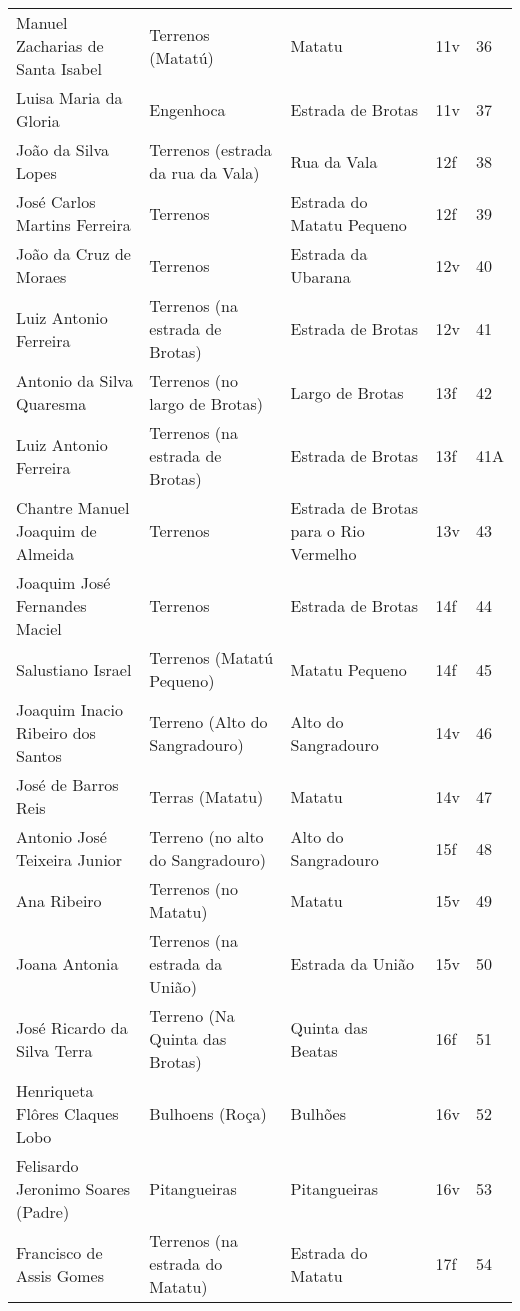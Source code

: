 \begin{table}
{\begin{minipage}{\textwidth}
\begin{tiny}
\begin{tabular}{p{4cm}p{4cm}p{4cm}ll}
Manuel Zacharias de Santa Isabel						&Terrenos (Matatú)			&Matatu					&11v			&36			\\
Luisa Maria da Gloria								&Engenhoca				&Estrada de Brotas			&11v			&37			\\
João da Silva Lopes								&Terrenos (estrada da rua da Vala)	&Rua da Vala				&12f			&38			\\
José Carlos Martins Ferreira							&Terrenos				&Estrada do Matatu Pequeno		&12f			&39			\\
João da Cruz de Moraes								&Terrenos				&Estrada da Ubarana			&12v			&40			\\
Luiz Antonio Ferreira								&Terrenos (na estrada de Brotas)	&Estrada de Brotas			&12v			&41			\\
Antonio da Silva Quaresma							&Terrenos (no largo de Brotas)		&Largo de Brotas			&13f			&42			\\
Luiz Antonio Ferreira								&Terrenos (na estrada de Brotas)	&Estrada de Brotas			&13f			&41A			\\
Chantre Manuel Joaquim de Almeida						&Terrenos				&Estrada de Brotas para o Rio Vermelho	&13v			&43			\\
Joaquim José Fernandes Maciel							&Terrenos				&Estrada de Brotas			&14f			&44			\\
Salustiano Israel								&Terrenos (Matatú Pequeno)		&Matatu Pequeno				&14f			&45			\\
Joaquim Inacio Ribeiro dos Santos						&Terreno (Alto do Sangradouro)		&Alto do Sangradouro			&14v			&46			\\
José de Barros Reis								&Terras (Matatu)			&Matatu					&14v			&47			\\
Antonio José Teixeira Junior							&Terreno (no alto do Sangradouro)	&Alto do Sangradouro			&15f			&48			\\
Ana Ribeiro									&Terrenos (no Matatu)			&Matatu					&15v			&49			\\
Joana Antonia									&Terrenos (na estrada da União)		&Estrada da União			&15v			&50			\\
José Ricardo da Silva Terra							&Terreno (Na Quinta das Brotas)		&Quinta das Beatas			&16f			&51			\\
Henriqueta Flôres Claques Lobo							&Bulhoens (Roça)			&Bulhões				&16v			&52			\\
Felisardo Jeronimo Soares (Padre)						&Pitangueiras				&Pitangueiras				&16v			&53			\\
Francisco de Assis Gomes							&Terrenos (na estrada do Matatu)	&Estrada do Matatu			&17f			&54			\\

\end{tabular}
\end{tiny}
\end{minipage}}
\end{table}

